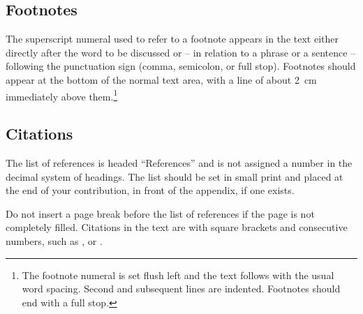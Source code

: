 \documentclass[runningheads]{llncs}
\begin{document}
\subsection{Footnotes}

The superscript numeral used to refer to a footnote appears in the text
either directly after the word to be discussed or -- in relation to a
phrase or a sentence -- following the punctuation sign (comma,
semicolon, or full stop). Footnotes should appear at the bottom of
the
normal text area, with a line of about 2~cm 
immediately above them.\footnote
{
   The footnote numeral is set flush left
   and the text follows with the usual word spacing. Second and subsequent
   lines are indented. Footnotes should end with a full stop.
}

\subsection{Citations}

The list of references is headed ``References'' and is not assigned a
number in the decimal system of headings. The list should be set in small print and placed at the end of your contribution, in front of the appendix, if one exists.

Do not insert a page break before the list of references if the page is not completely filled. Citations in the text are with square brackets and consecutive numbers, such as \cite{Alpher02}, or \cite{Alpher03,Herman04}.






\end{document}
